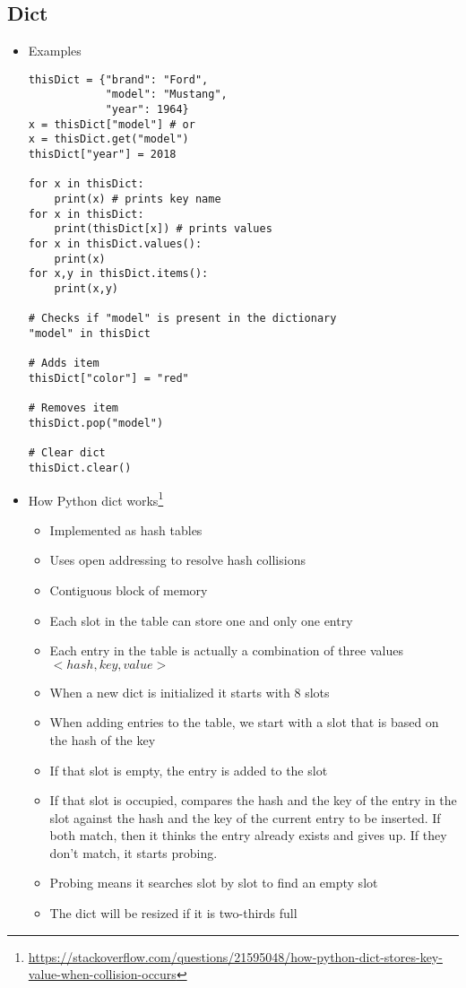 \documentclass[a4paper, 11.25pt]{article}
\begin{document}
\subsection{Dict}
\begin{itemize}
    \item Examples
    \begin{lstlisting}[style=PythonStyle]
thisDict = {"brand": "Ford",
            "model": "Mustang",
            "year": 1964}
x = thisDict["model"] # or 
x = thisDict.get("model")
thisDict["year"] = 2018

for x in thisDict:
    print(x) # prints key name
for x in thisDict:
    print(thisDict[x]) # prints values
for x in thisDict.values():
    print(x)
for x,y in thisDict.items():
    print(x,y)

# Checks if "model" is present in the dictionary
"model" in thisDict

# Adds item
thisDict["color"] = "red"

# Removes item
thisDict.pop("model")

# Clear dict
thisDict.clear()\end{lstlisting}
    \item How Python dict works\footnote{\url{https://stackoverflow.com/questions/21595048/how-python-dict-stores-key-value-when-collision-occurs}}
    \begin{itemize}
        \item Implemented as hash tables
        \item Uses open addressing to resolve hash collisions
        \item Contiguous block of memory
        \item Each slot in the table can store one and only one entry
        \item Each entry in the table is actually a combination of three values $<hash, key, value>$
        \item When a new dict is initialized it starts with 8 slots
        \item When adding entries to the table, we start with a slot that is based on the hash of the key
        \item If that slot is empty, the entry is added to the slot
        \item If that slot is occupied, compares the hash and the key of the entry in the slot against the hash and the key of the current entry to be inserted. If both match, then it thinks the entry already exists and gives up. If they don't match, it starts probing.
        \item Probing means it searches slot by slot to find an empty slot
        \item The dict will be resized if it is two-thirds full
    \end{itemize}
\end{itemize}
\end{document}
